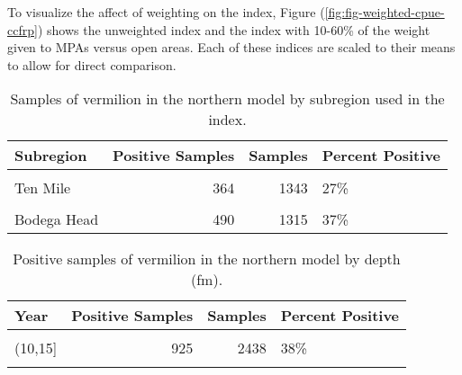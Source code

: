 \documentclass[
]{article}
\begin{document}
To visualize the affect of weighting on the index, Figure (\ref{fig:fig-weighted-cpue-ccfrp})
shows the unweighted index and the index with 10-60\% of the weight given to MPAs versus
open areas. Each of these indices are scaled to their means to allow for direct comparison.

\newpage

\begin{table}

\caption{\label{tab:tab-region-ccfrp}Samples of vermilion in the northern model by subregion used in the index.}
\centering
\begin{tabular}[t]{lrrl}
\toprule
Subregion & Positive Samples & Samples & Percent Positive\\
\midrule
\cellcolor{gray!6}{South Cape Mendocino} & \cellcolor{gray!6}{474} & \cellcolor{gray!6}{1854} & \cellcolor{gray!6}{26\%}\\
Ten Mile & 364 & 1343 & 27\%\\
\cellcolor{gray!6}{Stewarts Point} & \cellcolor{gray!6}{599} & \cellcolor{gray!6}{932} & \cellcolor{gray!6}{64\%}\\
Bodega Head & 490 & 1315 & 37\%\\
\bottomrule
\end{tabular}
\end{table}

\begin{table}

\caption{\label{tab:tab-depth-ccfrp}Positive samples of vermilion in the northern model by depth (fm).}
\centering
\begin{tabular}[t]{lrrl}
\toprule
Year & Positive Samples & Samples & Percent Positive\\
\midrule
\cellcolor{gray!6}{(0,10]} & \cellcolor{gray!6}{356} & \cellcolor{gray!6}{1589} & \cellcolor{gray!6}{22\%}\\
(10,15] & 925 & 2438 & 38\%\\
\cellcolor{gray!6}{(15,20]} & \cellcolor{gray!6}{646} & \cellcolor{gray!6}{1417} & \cellcolor{gray!6}{46\%}\\
\bottomrule
\end{tabular}
\end{table}
\end{document}
